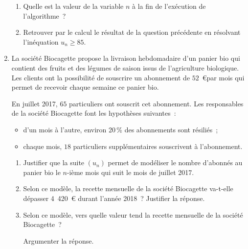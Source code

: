 \begin{enumerate}
\begin{enumerate}[label=\alph*.]
          \item Quelle est la valeur de la variable $n$ à la fin de l'exécution de l'algorithme~?
          \item Retrouver par le calcul le résultat de la question précédente en résolvant l'inéquation
          $u_n \geqslant 85$.
     \end{enumerate}
     \item  La société Biocagette propose la livraison hebdomadaire d'un panier bio qui contient des fruits
     et des légumes de saison issus de l'agriculture biologique. Les clients ont la possibilité de
     souscrire un abonnement de $52$~\euro par mois qui permet de recevoir chaque semaine ce panier
     bio.
     \par
     En juillet 2017, $65$ particuliers ont souscrit cet abonnement.
     \smallskip
     Les responsables de la société Biocagette font les hypothèses suivantes~:
     \begin{itemize}[label=---]
          \item d'un mois à l'autre, environ 20\,\% des abonnements sont résiliés~;
          \item chaque mois, $18$ particuliers supplémentaires souscrivent à l'abonnement.
     \end{itemize}
     \begin{enumerate}[label=\alph*.]
          \item Justifier que la suite $\left(u_n\right)$ permet de modéliser le nombre d'abonnés au panier bio le $n$-ième mois qui suit le mois de juillet 2017.
          \item Selon ce modèle, la recette mensuelle de la société Biocagette va-t-elle dépasser 4~420~\euro{} durant l'année 2018~? Justifier la réponse.
          \item Selon ce modèle, vers quelle valeur tend la recette mensuelle de la société Biocagette~?
          \par
          Argumenter la réponse.
     \end{enumerate}
\end{enumerate}
